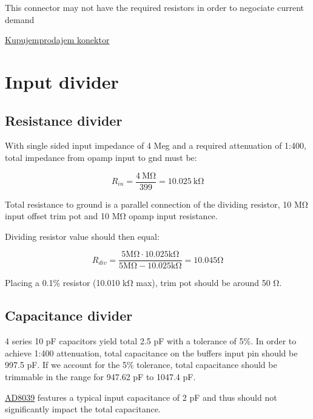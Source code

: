 \documentclass[11pt]{article}
\begin{document}
This connector may not have the required resistors in order to negociate 
current demand

\href{https://www.kupujemprodajem.com/elektronika-i-komponente/moduli-za-samoizgradnju/usb-c-konektor-za-montazu/oglas/149804414?filterId=4441321394}{Kupujemprodajem konektor}

\section{Input divider}
\subsection{Resistance divider}
With single sided input impedance of 4 Meg and a required attenuation of 1:400, total
impedance from opamp input to gnd must be:

\begin{equation}
  R_{in} = \frac{4\ \si{\mega \ohm}}{399} = 10.025\ \si{\kilo \ohm}
  \label{eq:res_to_gnd}
\end{equation}

Total resistance to ground is a parallel connection of the dividing resistor,
10 \si{\mega \ohm} input offset trim pot and 10 \si{\mega \ohm} opamp input resistance.

Dividing resistor value should then equal:

\begin{equation}
  R_{div} = \frac{5 \si{\mega \ohm} \cdot 
  10.025 \si{\kilo \ohm}}{5 \si{\mega \ohm} - 10.025 \si{\kilo \ohm}} = 
  10.045 \si{\ohm}
  \label{eq:input_divider}
\end{equation}

Placing a 0.1\% resistor (10.010 \si{\kilo \ohm} max), trim pot should be around 
50 \si{\ohm}.

\subsection{Capacitance divider}
4 series 10 \si{\pico \farad } capacitors yield total 2.5 \si{\pico \farad } with a 
tolerance of 5\%. In order to achieve 1:400 attenuation, total capacitance on the 
buffers input pin should be 997.5 pF. If we account for the 5\% tolerance, 
total capacitance should be trimmable in the range for 947.62 pF to 1047.4 pF.

\href{https://www.analog.com/media/en/technical-documentation/data-sheets/AD8038_8039.pdf}{AD8039}
features a typical input capacitance of 2 pF and thus should not significantly 
impact the total capacitance.
\end{document}
